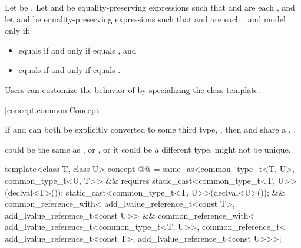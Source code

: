 \begin{itemdescr}
\pnum
Let  be .
Let  and  be equality-preserving
expressions such that
 and  are each , and
let  and  be equality-preserving expressions such that
 and  are each .
 and  model 
only if:
\begin{itemize}
\item {} equals  if and only if
   equals , and
\item {} equals  if and only if
   equals .
\end{itemize}

\pnum
\begin{note}
Users can customize the behavior of  by specializing
the  class template.
\end{note}
\end{itemdescr}

[concept.common]{Concept }

\pnum
If  and  can both be explicitly converted to some third type,
, then  and  share a ,
.
\begin{note}
 could be the same as , or , or it could be a
different type.  might not be unique.
\end{note}

\begin{itemdecl}
template<class T, class U>
  concept @@ =
    same_as<common_type_t<T, U>, common_type_t<U, T>> &&
    requires {
      static_cast<common_type_t<T, U>>(declval<T>());
      static_cast<common_type_t<T, U>>(declval<U>());
    } &&
    common_reference_with<
      add_lvalue_reference_t<const T>,
      add_lvalue_reference_t<const U>> &&
    common_reference_with<
      add_lvalue_reference_t<common_type_t<T, U>>,
      common_reference_t<
        add_lvalue_reference_t<const T>,
        add_lvalue_reference_t<const U>>>;
\end{itemdecl}

